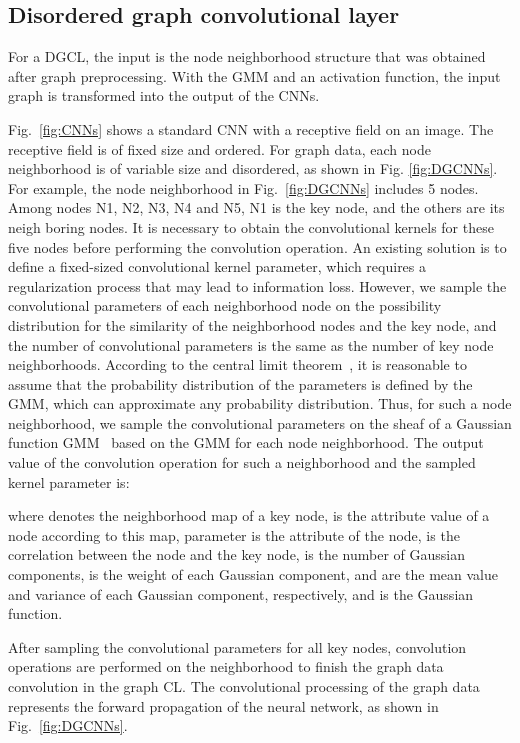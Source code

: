 \documentclass[11pt]{article}
\begin{document}
\subsection{Disordered graph convolutional layer}
For a DGCL, the input is the node neighborhood structure that was obtained after graph preprocessing. With the GMM and an activation function, the input graph is transformed into the output of the CNNs.

Fig.~\ref{fig:CNNs} shows a standard CNN with a receptive field on an image. The receptive field is of fixed size and ordered. For graph data, each node neighborhood is of variable size and disordered, as shown in Fig. \ref{fig:DGCNNs}. For example, the node neighborhood in Fig.~\ref{fig:DGCNNs} includes 5 nodes. Among nodes N1, N2, N3, N4 and N5, N1 is the key node, and the others are its neigh boring nodes. It is necessary to obtain the convolutional kernels for these five nodes before performing the convolution operation. An existing solution is to define a fixed-sized convolutional kernel parameter, which requires a regularization process that may lead to information loss. However, we sample the convolutional parameters of each neighborhood node on the possibility distribution for the similarity of the neighborhood nodes and the key node, and the number of convolutional parameters is the same as the number of key node neighborhoods. According to the central limit theorem~\cite{Cs2002Almost}, it is reasonable to assume that the probability distribution of the parameters is defined by the GMM, which can approximate any probability distribution. Thus, for such a node neighborhood, we sample the convolutional parameters on the sheaf of a Gaussian function GMM~ based on the GMM for each node neighborhood. The output value of the convolution operation for such a neighborhood and the sampled kernel parameter is:



where  denotes the neighborhood map of a key node,  is the attribute value of a node according to this map, parameter  is the attribute of the  node,  is the correlation between the  node and the key node,  is the number of Gaussian components,  is the weight of each Gaussian component,  and  are the mean value and variance of each Gaussian component, respectively, and  is the Gaussian function.



After sampling the convolutional parameters for all key nodes, convolution operations are performed on the neighborhood to finish the graph data convolution in the graph CL. The convolutional processing of the graph data represents the forward propagation of the neural network, as shown in Fig.~\ref{fig:DGCNNs}.
\end{document}
